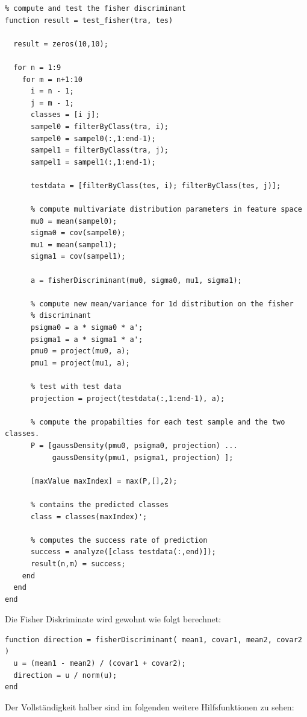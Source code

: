 \documentclass{article}
\begin{document}
\begin{lstlisting} 
% compute and test the fisher discriminant
function result = test_fisher(tra, tes)

  result = zeros(10,10);

  for n = 1:9
    for m = n+1:10
      i = n - 1;
      j = m - 1;
      classes = [i j];
      sampel0 = filterByClass(tra, i);
      sampel0 = sampel0(:,1:end-1);
      sampel1 = filterByClass(tra, j);
      sampel1 = sampel1(:,1:end-1);

      testdata = [filterByClass(tes, i); filterByClass(tes, j)];

      % compute multivariate distribution parameters in feature space
      mu0 = mean(sampel0);
      sigma0 = cov(sampel0);
      mu1 = mean(sampel1);
      sigma1 = cov(sampel1);

      a = fisherDiscriminant(mu0, sigma0, mu1, sigma1);

      % compute new mean/variance for 1d distribution on the fisher 
      % discriminant
      psigma0 = a * sigma0 * a';
      psigma1 = a * sigma1 * a';
      pmu0 = project(mu0, a);
      pmu1 = project(mu1, a);
    
      % test with test data
      projection = project(testdata(:,1:end-1), a);

      % compute the propabilties for each test sample and the two classes.
      P = [gaussDensity(pmu0, psigma0, projection) ...
           gaussDensity(pmu1, psigma1, projection) ];

      [maxValue maxIndex] = max(P,[],2);
      
      % contains the predicted classes
      class = classes(maxIndex)';

      % computes the success rate of prediction
      success = analyze([class testdata(:,end)]);
      result(n,m) = success;
    end
  end
end
\end{lstlisting} 
Die Fisher Diskriminate wird gewohnt wie folgt berechnet:
\begin{lstlisting} 
function direction = fisherDiscriminant( mean1, covar1, mean2, covar2 )
  u = (mean1 - mean2) / (covar1 + covar2);
  direction = u / norm(u);
end
\end{lstlisting} 
Der Vollständigkeit halber sind im folgenden weitere Hilfsfunktionen zu sehen:
\end{document}
